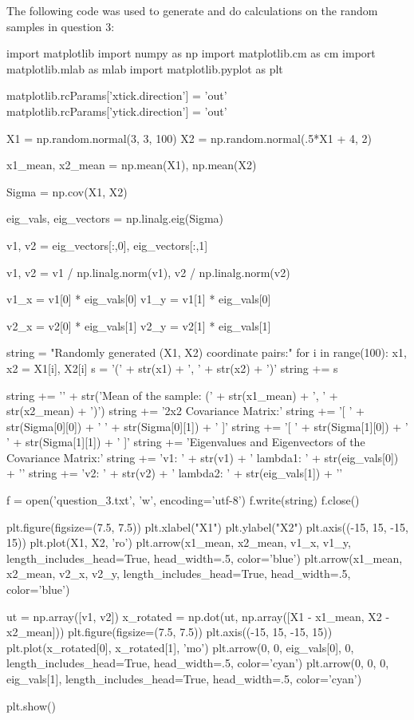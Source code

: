 \documentclass{article}
\begin{document}
The following code was used to generate and do calculations on the random samples in question 3:
\begin{python}
import matplotlib
import numpy as np
import matplotlib.cm as cm
import matplotlib.mlab as mlab
import matplotlib.pyplot as plt

matplotlib.rcParams['xtick.direction'] = 'out'
matplotlib.rcParams['ytick.direction'] = 'out'

X1 = np.random.normal(3, 3, 100)
X2 = np.random.normal(.5*X1 + 4, 2)

x1_mean, x2_mean = np.mean(X1), np.mean(X2)

Sigma = np.cov(X1, X2)

eig_vals, eig_vectors = np.linalg.eig(Sigma)

v1, v2 = eig_vectors[:,0], eig_vectors[:,1]

v1, v2 = v1 / np.linalg.norm(v1), v2 / np.linalg.norm(v2)

v1_x = v1[0] * eig_vals[0]
v1_y = v1[1] * eig_vals[0]

v2_x = v2[0] * eig_vals[1]
v2_y = v2[1] * eig_vals[1]

string = "Randomly generated (X1, X2) coordinate pairs:\n"
for i in range(100):
    x1, x2 = X1[i], X2[i]
    s = '(' + str(x1) + ', ' + str(x2) + ')\n'
    string += s

string += '\n\n' + str('Mean of the sample: (' + str(x1_mean) + ', ' + str(x2_mean) + ')\n\n')
string += '2x2 Covariance Matrix:\n'
string += '[ ' + str(Sigma[0][0]) + '  ' + str(Sigma[0][1]) + ' ]\n'
string += '[ ' + str(Sigma[1][0]) + '  ' + str(Sigma[1][1]) + ' ]\n\n'
string += 'Eigenvalues and Eigenvectors of the Covariance Matrix:\n'
string += 'v1: ' + str(v1) + '  lambda1: ' + str(eig_vals[0]) + '\n'
string += 'v2: ' + str(v2) + '  lambda2: ' + str(eig_vals[1]) + '\n'

f = open('question_3.txt', 'w', encoding='utf-8')
f.write(string)
f.close()

plt.figure(figsize=(7.5, 7.5))
plt.xlabel("X1")
plt.ylabel("X2")
plt.axis((-15, 15, -15, 15))
plt.plot(X1, X2, 'ro')
plt.arrow(x1_mean, x2_mean, v1_x, v1_y, length_includes_head=True, head_width=.5, color='blue')
plt.arrow(x1_mean, x2_mean, v2_x, v2_y, length_includes_head=True, head_width=.5, color='blue')

ut = np.array([v1, v2])
x_rotated = np.dot(ut, np.array([X1 - x1_mean, X2 - x2_mean]))
plt.figure(figsize=(7.5, 7.5))
plt.axis((-15, 15, -15, 15))
plt.plot(x_rotated[0], x_rotated[1], 'mo')
plt.arrow(0, 0, eig_vals[0], 0, length_includes_head=True, head_width=.5, color='cyan')
plt.arrow(0, 0, 0, eig_vals[1], length_includes_head=True, head_width=.5, color='cyan')

plt.show()
\end{python}
\newpage
\end{document}
